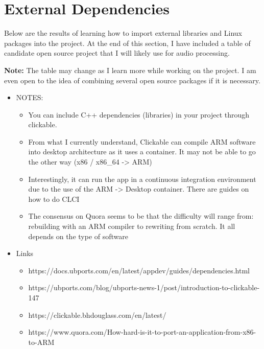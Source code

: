 \section{External Dependencies}


Below are the results of learning how to import external libraries and Linux packages into the project. At the end of this section, I have included a table of candidate open source project that I will likely use for audio processing. 

\textbf{Note:} The table may change as I learn more while working on the project. I am even open to the idea of combining several open source packages if it is necessary.


\begin{itemize}
	\item NOTES:
	\begin{itemize}
		\item You can include C++ dependencies (libraries) in your project through clickable.
		\item From what I currently understand, Clickable can compile ARM software into desktop architecture as it uses a container. It may not be able to go the other way (x86 / x86\_64 -> ARM)
		\item Interestingly, it can run the app in a continuous integration environment due to the use of the ARM -> Desktop container. There are guides on how to do CLCI
		\item The consensus on Quora seems to be that the difficulty will range from: rebuilding with an ARM compiler to rewriting from scratch. It all depends on the type of software
	\end{itemize}
\end{itemize}



\begin{itemize}
	\item Links
	\begin{itemize}
		\item https://docs.ubports.com/en/latest/appdev/guides/dependencies.html
		\item https://ubports.com/blog/ubports-news-1/post/introduction-to-clickable-147
		\item https://clickable.bhdouglass.com/en/latest/
		\item https://www.quora.com/How-hard-is-it-to-port-an-application-from-x86-to-ARM
	\end{itemize}
\end{itemize}



